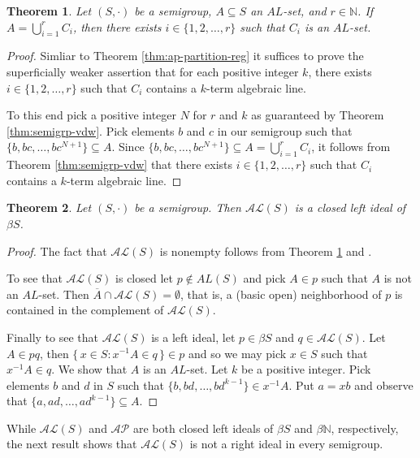 \documentclass[12pt,showtrims]{memoir}
\theoremstyle{plain}
\newtheorem{thm}{Theorem}[section]
\theoremstyle{definition}
\newcommand{\bbN}{\mathbb{N}}
\newcommand{\AP}{\mathcal{AP}}
\newcommand{\AL}{\mathcal{AL}}
\begin{document}
\begin{thm}
  \label{thm:al-partition-reg}
  Let $(S, \cdot)$ be a semigroup, $A \subseteq S$ an $AL$-set, and $r \in \bbN$.
  If $A = \bigcup_{i=1}^r C_i$, then there exists $i \in \{1, 2, \ldots, r\}$ such that $C_i$ is an $AL$-set.
\end{thm}
\begin{proof}
  Simliar to Theorem \ref{thm:ap-partition-reg} it suffices to prove the superficially weaker assertion that for each positive integer $k$, there exists $i \in \{1, 2, \ldots, r\}$ such that $C_i$ contains a $k$-term algebraic line.
  
  To this end pick a positive integer $N$ for $r$ and $k$ as guaranteed by Theorem \ref{thm:semigrp-vdw}. 
  Pick elements $b$ and $c$ in our semigroup such that $\{b, bc, \ldots, bc^{N+1}\} \subseteq A$. 
  Since $\{b, bc, \ldots, bc^{N+1}\} \subseteq A = \bigcup_{i=1}^r C_i$, it follows from Theorem \ref{thm:semigrp-vdw} that there exists $i \in \{1, 2, \ldots, r\}$ such that $C_i$ contains a $k$-term algebraic line.
\end{proof}

\begin{thm}
  Let $(S, \cdot)$ be a semigroup.
  Then $\AL(S)$ is a closed left ideal of $\beta S$.
\end{thm}
\begin{proof}
  The fact that $\AL(S)$ is nonempty follows from Theorem \ref{thm:al-partition-reg} and \cite[Theorem 3.11]{Hindman:1998fk}. 

  To see that $\AL(S)$ is closed let $p \not\in AL(S)$ and pick $A \in p$ such that $A$ is not an $AL$-set.
  Then $\overline{A} \cap \AL(S) = \emptyset$, that is, a (basic open) neighborhood of $p$ is contained in the complement of $\AL(S)$.

  Finally to see that $\AL(S)$ is a left ideal, let $p \in \beta S$ and $q \in \AL(S)$. 
  Let $A \in pq$, then $\{\, x \in S : x^{-1}A \in q \,\} \in p$ and so we may pick $x \in S$ such that $x^{-1}A \in q$. 
  We show that $A$ is an $AL$-set.
  Let $k$ be a positive integer.
  Pick elements $b$ and $d$ in $S$ such that $\{b, bd, \ldots, bd^{k-1}\} \in x^{-1}A$.
  Put $a = xb$ and observe that $\{a, ad, \ldots, ad^{k-1}\} \subseteq A$.
\end{proof}

While $\AL(S)$ and $\AP$ are both closed left ideals of $\beta S$ and $\beta \bbN$, respectively, the next result shows that $\AL(S)$ is not a right ideal in every semigroup. 
\end{document}
